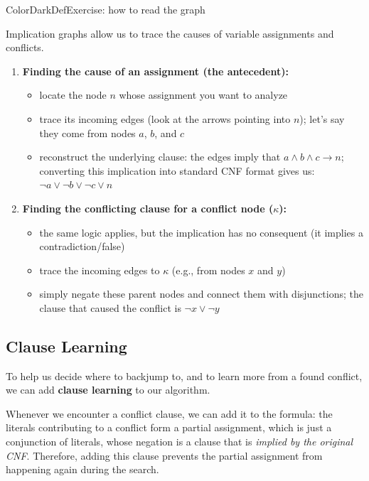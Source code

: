 \documentclass[a4paper, 11pt]{report}
\begin{document}
\begin{cframe}{ColorDarkDef}{Exercise: how to read the graph}
\begin{center}
\end{center}
Implication graphs allow us to trace the causes of variable assignments and conflicts.

\begin{enumerate}
    \item \textbf{Finding the cause of an assignment (the antecedent):}
    \begin{itemize}
        \item locate the node $n$ whose assignment you want to analyze
        \item trace its incoming edges (look at the arrows pointing into $n$); let's say they come from nodes $a$, $b$, and $c$
        \item reconstruct the underlying clause: the edges imply that $a \land b \land c \to n$; converting this implication into standard CNF format gives us: $\neg a \lor \neg b \lor \neg c \lor n$
    \end{itemize}
    
    \item \textbf{Finding the conflicting clause for a conflict node ($\kappa$):}
    \begin{itemize}
        \item the same logic applies, but the implication has no consequent (it implies a contradiction/false)
        \item trace the incoming edges to $\kappa$ (e.g., from nodes $x$ and $y$)
        \item simply negate these parent nodes and connect them with disjunctions; the clause that caused the conflict is $\neg x \lor \neg y$
    \end{itemize}
\end{enumerate}

\end{cframe}

\subsection{Clause Learning}
To help us decide where to backjump to, and to learn more from a found conflict, we can add \textbf{clause learning} to our algorithm.

Whenever we encounter a conflict clause, we can add it to the formula: the literals contributing to a conflict form a partial assignment, which is just a conjunction of literals, whose negation is a clause that is \textit{implied by the original CNF}. Therefore, adding this clause prevents the partial assignment from happening again during the search.
\end{document}
